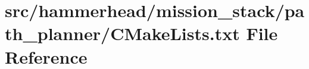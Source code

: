 \hypertarget{mission__stack_2path__planner_2CMakeLists_8txt}{}\section{src/hammerhead/mission\+\_\+stack/path\+\_\+planner/\+C\+Make\+Lists.txt File Reference}
\label{mission__stack_2path__planner_2CMakeLists_8txt}
